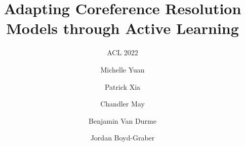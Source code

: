 

\title[Title]{Adapting Coreference Resolution Models through Active Learning}
\subtitle{ACL 2022}

\author{Michelle Yuan
\and Patrick Xia
\and Chandler May \\
\and Benjamin Van Durme
\and Jordan Boyd-Graber
}

\date{}
\frame[noframenumbering]{\titlepage}
